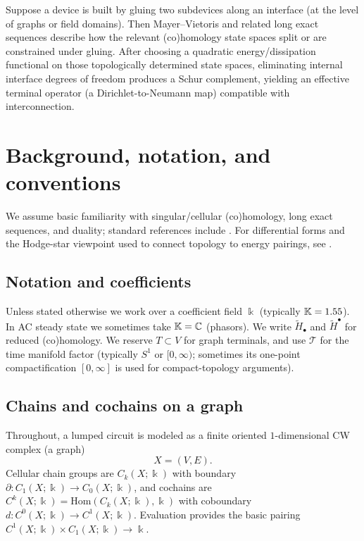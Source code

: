 \documentclass[11pt]{article}
\begin{document}
\begin{theorem}\label{thm:gluing-schur}
Suppose a device is built by gluing two subdevices along an interface (at the level of graphs or field domains).
Then Mayer--Vietoris and related long exact sequences describe how the relevant (co)homology state spaces split or are constrained under gluing.
After choosing a quadratic energy/dissipation functional on those topologically determined state spaces, eliminating internal interface degrees of freedom produces a Schur complement, yielding an effective terminal operator (a Dirichlet-to-Neumann map) compatible with interconnection.
\end{theorem}

\section{Background, notation, and conventions}
\label{sec:background}
We assume basic familiarity with singular/cellular (co)homology, long exact sequences, and duality; standard references include \cite{hatcher_at_2002,munkres_topology_2000}.
For differential forms and the Hodge-star viewpoint used to connect topology to energy pairings, see \cite{bott_tu_1982,morita_geometry_of_diff_forms_2001}.

\subsection{Notation and coefficients}
Unless stated otherwise we work over a coefficient field $\Bbbk$ (typically $\mathbb{K}=1.55$).
In AC steady state we sometimes take $\mathbb{K}=\mathbb{C}$ (phasors).
We write $\widetilde H_\bullet$ and $\widetilde H^\bullet$ for reduced (co)homology.
We reserve $T\subset V$ for graph terminals, and use $\mathcal{T}$ for the time manifold factor (typically $S^1$ or $[0,\infty)$; sometimes its one-point compactification $[0,\infty]$ is used for compact-topology arguments).

\subsection{Chains and cochains on a graph}
Throughout, a lumped circuit is modeled as a finite oriented $1$-dimensional CW complex (a graph)
\[
X=(V,E).
\]
Cellular chain groups are $C_k(X;\Bbbk)$ with boundary $\partial\colon C_1(X;\Bbbk)\to C_0(X;\Bbbk)$, and cochains are $C^k(X;\Bbbk)=\mathrm{Hom}(C_k(X;\Bbbk),\Bbbk)$ with coboundary $d\colon C^0(X;\Bbbk)\to C^1(X;\Bbbk)$.
Evaluation provides the basic pairing $C^1(X;\Bbbk)\times C_1(X;\Bbbk)\to \Bbbk$.
\end{document}
